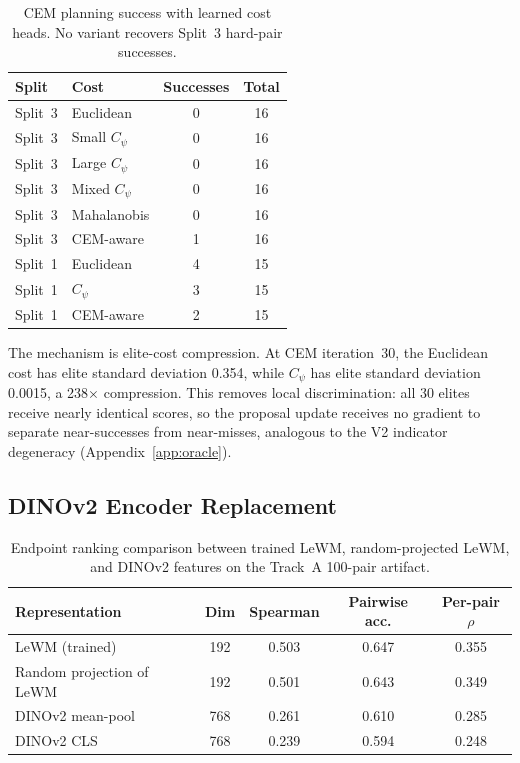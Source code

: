 \begin{table}[h]
\centering
\caption{CEM planning success with learned cost heads.  No variant recovers
Split~3 hard-pair successes.}
\label{tab:h-cost-planning}
\small
\begin{tabular}{llcc}
\toprule
Split & Cost & Successes & Total \\
\midrule
Split~3 & Euclidean & 0 & 16 \\
Split~3 & Small $C_\psi$ & 0 & 16 \\
Split~3 & Large $C_\psi$ & 0 & 16 \\
Split~3 & Mixed $C_\psi$ & 0 & 16 \\
Split~3 & Mahalanobis & 0 & 16 \\
Split~3 & CEM-aware & 1 & 16 \\
Split~1 & Euclidean & 4 & 15 \\
Split~1 & $C_\psi$ & 3 & 15 \\
Split~1 & CEM-aware & 2 & 15 \\
\bottomrule
\end{tabular}
\end{table}

The mechanism is elite-cost compression.  At CEM iteration~30, the
Euclidean cost has elite standard deviation 0.354, while $C_\psi$ has elite
standard deviation 0.0015, a 238$\times$ compression.  This removes local
discrimination: all 30 elites receive nearly identical scores, so the
proposal update receives no gradient to separate near-successes from
near-misses, analogous to the V2 indicator degeneracy
(Appendix~\ref{app:oracle}).

\subsection{DINOv2 Encoder Replacement}
\label{app:negative_dinov2}

\begin{table}[h]
\centering
\caption{Endpoint ranking comparison between trained LeWM,
random-projected LeWM, and DINOv2 features on the Track~A 100-pair
artifact.}
\label{tab:h-dino}
\small
\begin{tabular}{lcccc}
\toprule
Representation & Dim & Spearman & Pairwise acc. & Per-pair $\rho$ \\
\midrule
LeWM (trained) & 192 & 0.503 & 0.647 & 0.355 \\
Random projection of LeWM & 192 & 0.501 & 0.643 & 0.349 \\
DINOv2 mean-pool & 768 & 0.261 & 0.610 & 0.285 \\
DINOv2 CLS & 768 & 0.239 & 0.594 & 0.248 \\
\bottomrule
\end{tabular}
\end{table}

